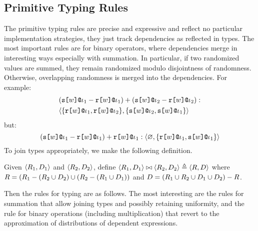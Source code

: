 \subsection{Primitive Typing Rules}

The primitive typing rules are precise and expressive and reflect no particular
implementation strategies, they just track dependencies as reflected in types.
The most important rules are for binary operators, where dependencies merge
in interesting ways especially with summation. In particular, if two
randomized values are summed, they remain randomized modulo disjointness
of randomness. Otherwise, overlapping randomness is merged into the dependencies.
For example:
\begin{eqnarray*}
& (\texttt{s[}w\texttt{]}\texttt{@}\iota_1 - \texttt{r[}w\texttt{]}\texttt{@}\iota_1) + (\texttt{s[}w\texttt{]}\texttt{@}\iota_2 - \texttt{r[}w\texttt{]}\texttt{@}\iota_2) : \\
& \langle \{ \texttt{r[}w\texttt{]}\texttt{@}\iota_1,\texttt{r[}w\texttt{]}\texttt{@}\iota_2 \}, \{ \texttt{s[}w\texttt{]}\texttt{@}\iota_2,\texttt{s[}w\texttt{]}\texttt{@}\iota_1 \} \rangle
\end{eqnarray*}
but:
$$
(\texttt{s[}w\texttt{]}\texttt{@}\iota_1 - \texttt{r[}w\texttt{]}\texttt{@}\iota_1) + \texttt{r[}w\texttt{]}\texttt{@}\iota_1 :
\langle \varnothing, \{ \texttt{r[}w\texttt{]}\texttt{@}\iota_1,\texttt{s[}w\texttt{]}\texttt{@}\iota_1 \} \rangle
$$
To join types appropriately, we make the following definition.
\begin{definition}
  Given $\langle R_1, D_1 \rangle$ and $\langle R_2, D_2 \rangle$, define
  $\langle R_1, D_1 \rangle \bowtie \langle R_2, D_2 \rangle \triangleq \langle R, D \rangle$ where
  $R = (R_1 - (R_2 \cup D_2) \cup (R_2 - (R_1 \cup D_1))$ 
  and $D = (R_1 \cup R_2 \cup D_1 \cup D_2) - R $.
\end{definition}
Then the rules for typing are as follows. The most interesting are the rules
for summation that allow joining types and possibly retaining uniformity,
and the rule for binary operations (including multiplication) that
revert to the approximation of distributions of dependent expressions.


